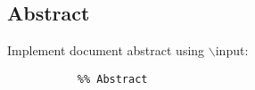 
\subsection{Abstract}

Implement document abstract using $\backslash$input:
\begin{verbatim}
           %% Abstract
\end{verbatim}

